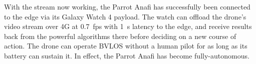 With the stream now working, the Parrot Anafi has successfully been connected to the edge via its Galaxy Watch 4 payload. The watch can offload the drone's video stream over 4G at 0.7~fps with 1~s latency to the edge, and receive results back from the powerful algorithms there before deciding on a new course of action. The drone can operate BVLOS without a human pilot for as long as its battery can sustain it. In effect, the Parrot Anafi has become fully-autonomous.

